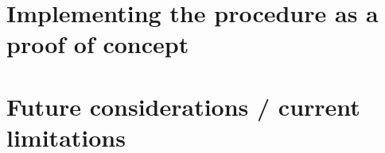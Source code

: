 \documentclass[titlepage]{report}
\begin{document}



























\chapter{Implementing the procedure as a proof of concept}
\label{ch:implementing}










\chapter{Future considerations / current limitations}
\label{ch:limitations}
\end{document}
